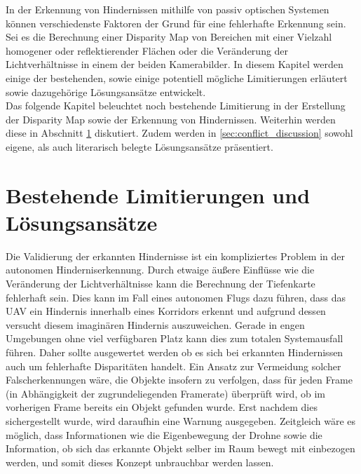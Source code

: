 In der Erkennung von Hindernissen mithilfe von passiv optischen Systemen können verschiedenste Faktoren der Grund für eine fehlerhafte Erkennung sein. Sei es die Berechnung einer Disparity Map von Bereichen mit einer Vielzahl homogener oder reflektierender Flächen oder die Veränderung der Lichtverhältnisse in einem der beiden Kamerabilder. In diesem Kapitel werden einige der bestehenden, sowie einige potentiell mögliche Limitierungen erläutert sowie dazugehörige Lösungsansätze entwickelt.\\

\noindent
Das folgende Kapitel beleuchtet noch bestehende Limitierung in der Erstellung der Disparity Map sowie der Erkennung von Hindernissen. Weiterhin werden diese in Abschnitt \ref{sec:existing_conflicts} diskutiert. Zudem werden in \ref{sec:conflict_discussion} sowohl eigene, als auch literarisch belegte Lösungsansätze präsentiert.

\section{Bestehende Limitierungen und Lösungsansätze}
\label{sec:existing_conflicts}

Die Validierung der erkannten Hindernisse ist ein kompliziertes Problem in der autonomen Hinderniserkennung. Durch etwaige äußere Einflüsse wie die Veränderung der Lichtverhältnisse kann die Berechnung der Tiefenkarte fehlerhaft sein. Dies kann im Fall eines autonomen Flugs dazu führen, dass das UAV ein Hindernis innerhalb eines Korridors erkennt und aufgrund dessen versucht diesem imaginären Hindernis auszuweichen. Gerade in engen Umgebungen ohne viel verfügbaren Platz kann dies zum totalen Systemausfall führen. Daher sollte ausgewertet werden ob es sich bei erkannten Hindernissen auch um fehlerhafte Disparitäten handelt. Ein Ansatz zur Vermeidung solcher Falscherkennungen wäre, die Objekte insofern zu verfolgen, dass für jeden Frame (in Abhängigkeit der zugrundeliegenden Framerate) überprüft wird, ob im vorherigen Frame bereits ein Objekt gefunden wurde. Erst nachdem dies sichergestellt wurde, wird daraufhin eine Warnung ausgegeben. Zeitgleich wäre es möglich, dass Informationen wie die Eigenbewegung der Drohne sowie die Information, ob sich das erkannte Objekt selber im Raum bewegt mit einbezogen werden, und somit dieses Konzept unbrauchbar werden lassen.\\

